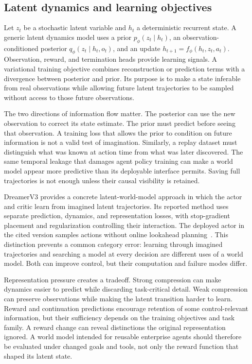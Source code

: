 \subsection{Latent dynamics and learning objectives}
\label{sec:C06:latent}
Let $z_t$ be a stochastic latent variable and $h_t$ a deterministic recurrent state. A generic latent dynamics model uses a prior $p_\phi(z_t\mid h_t)$, an observation-conditioned posterior $q_\phi(z_t\mid h_t,o_t)$, and an update $h_{t+1}=f_\phi(h_t,z_t,a_t)$. Observation, reward, and termination heads provide learning signals. A variational training objective combines reconstruction or prediction terms with a divergence between posterior and prior. Its purpose is to make a state inferable from real observations while allowing future latent trajectories to be sampled without access to those future observations.

The two directions of information flow matter. The posterior can use the new observation to correct its state estimate. The prior must predict before seeing that observation. A training loss that allows the prior to condition on future information is not a valid test of imagination. Similarly, a replay dataset must distinguish what was known at action time from what was later discovered. The same temporal leakage that damages agent policy training can make a world model appear more predictive than its deployable interface permits. Saving full trajectories is not enough unless their causal visibility is retained.

DreamerV3 provides a concrete latent-world-model approach in which the actor and critic learn from imagined latent trajectories. Its reported method uses separate prediction, dynamics, and representation losses, with stop-gradient placement and regularization controlling their interaction. The deployed actor in the cited version samples actions without online lookahead planning~\cite{hafner2023dreamerv3}. This distinction prevents a common category error: learning through imagined trajectories and searching a model at every decision are different uses of a world model. Both can improve control, but their computation and failure modes differ.

Representation pressure creates a tradeoff. Strong compression can make dynamics easier to predict while discarding task-critical detail. Weak compression can preserve observations while making the latent transition harder to learn. Reward and continuation predictions encourage retention of some control-relevant information, but their sufficiency depends on the training objectives and task family. A reward change can reveal distinctions the original representation ignored. A world model intended for reusable enterprise agents should therefore be evaluated under changed goals and tools, not only the reward function that shaped its latent state.


